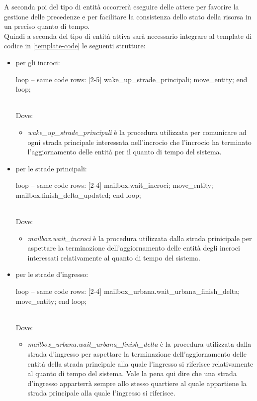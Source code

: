 A seconda poi del tipo di entità occorrerà eseguire delle attese per favorire la gestione delle precedenze e per facilitare la consistenza dello stato della risorsa in un preciso quanto di tempo. \\
Quindi a seconda del tipo di entità attiva sarà necessario integrare al template di codice in \ref{template-code} le seguenti strutture:
\begin{itemize}
\item per gli incroci:\\
\begin{codiceada}[caption={Template-Code incroci}, label=template-code-incroci]
loop
	-- same code rows: [2-5]
	wake_up_strade_principali;
	move_entity;
end loop;
\end{codiceada}
\\
Dove:
\begin{itemize}
\item \textit{wake\_up\_strade\_principali} è la procedura utilizzata per comunicare ad ogni strada principale interessata nell'incrocio che l'incrocio ha terminato l'aggiornamento delle entità per il quanto di tempo del sistema.
\end{itemize}
\item per le strade principali:\\
\begin{codiceada}[caption={Template-Code strade principali}, label=template-code-principali]
loop
	-- same code rows: [2-4]
	mailbox.wait_incroci;	
	move_entity;
	mailbox.finish_delta_updated;
end loop;
\end{codiceada}
\\
Dove:
\begin{itemize}
\item \textit{mailbox.wait\_incroci} è la procedura utilizzata dalla strada prinicipale per aspettare la terminazione dell'aggiornamento delle entità degli incroci interessati relativamente al quanto di tempo del sistema.
\end{itemize}
\item per le strade d'ingresso:\\
\begin{codiceada}[caption={Template-Code strade ingresso}, label=template-code-ingresso]
loop
	-- same code rows: [2-4]
	mailbox_urbana.wait_urbana_finish_delta;	
	move_entity;
end loop;
\end{codiceada}
\\
Dove:
\begin{itemize}
\item \textit{mailbox\_urbana.wait\_urbana\_finish\_delta	
} è la procedura utilizzata dalla strada d'ingresso per aspettare la terminazione dell'aggiornamento delle entità della strada principale alla quale l'ingresso si riferisce relativamente al quanto di tempo del sistema. Vale la pena qui dire che una strada d'ingresso apparterrà sempre allo stesso quartiere al quale appartiene la strada principale alla quale l'ingresso si riferisce.
\end{itemize}
\end{itemize}

